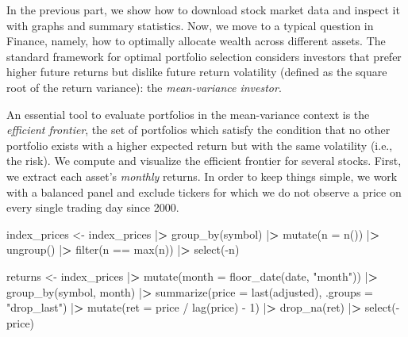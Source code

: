 \documentclass[
]{book}
\newenvironment{Shaded}{\begin{snugshade}}{\end{snugshade}}
\newcommand{\AttributeTok}[1]{\textcolor[rgb]{0.61,0.61,0.61}{#1}}
\newcommand{\DecValTok}[1]{\textcolor[rgb]{0.06,0.06,0.06}{#1}}
\newcommand{\ErrorTok}[1]{\textcolor[rgb]{0.14,0.14,0.14}{\textbf{#1}}}
\newcommand{\FunctionTok}[1]{\textcolor[rgb]{0,0,0}{#1}}
\newcommand{\NormalTok}[1]{#1}
\newcommand{\OtherTok}[1]{\textcolor[rgb]{0.37,0.37,0.37}{#1}}
\newcommand{\SpecialCharTok}[1]{\textcolor[rgb]{0,0,0}{#1}}
\newcommand{\StringTok}[1]{\textcolor[rgb]{0.5,0.5,0.5}{#1}}
\begin{document}
In the previous part, we show how to download stock market data and inspect it with graphs and summary statistics. Now, we move to a typical question in Finance, namely, how to optimally allocate wealth across different assets. The standard framework for optimal portfolio selection considers investors that prefer higher future returns but dislike future return volatility (defined as the square root of the return variance): the \emph{mean-variance investor}.

An essential tool to evaluate portfolios in the mean-variance context is the \emph{efficient frontier}, the set of portfolios which satisfy the condition that no other portfolio exists with a higher expected return but with the same volatility (i.e., the risk). We compute and visualize the efficient frontier for several stocks.
First, we extract each asset's \emph{monthly} returns. In order to keep things simple, we work with a balanced panel and exclude tickers for which we do not observe a price on every single trading day since 2000.

\begin{Shaded}
\begin{Highlighting}[]
\NormalTok{index\_prices }\OtherTok{\textless{}{-}}\NormalTok{ index\_prices }\SpecialCharTok{|}\ErrorTok{\textgreater{}}
  \FunctionTok{group\_by}\NormalTok{(symbol) }\SpecialCharTok{|}\ErrorTok{\textgreater{}}
  \FunctionTok{mutate}\NormalTok{(}\AttributeTok{n =} \FunctionTok{n}\NormalTok{()) }\SpecialCharTok{|}\ErrorTok{\textgreater{}}
  \FunctionTok{ungroup}\NormalTok{() }\SpecialCharTok{|}\ErrorTok{\textgreater{}}
  \FunctionTok{filter}\NormalTok{(n }\SpecialCharTok{==} \FunctionTok{max}\NormalTok{(n)) }\SpecialCharTok{|}\ErrorTok{\textgreater{}}
  \FunctionTok{select}\NormalTok{(}\SpecialCharTok{{-}}\NormalTok{n)}

\NormalTok{returns }\OtherTok{\textless{}{-}}\NormalTok{ index\_prices }\SpecialCharTok{|}\ErrorTok{\textgreater{}}
  \FunctionTok{mutate}\NormalTok{(}\AttributeTok{month =} \FunctionTok{floor\_date}\NormalTok{(date, }\StringTok{"month"}\NormalTok{)) }\SpecialCharTok{|}\ErrorTok{\textgreater{}}
  \FunctionTok{group\_by}\NormalTok{(symbol, month) }\SpecialCharTok{|}\ErrorTok{\textgreater{}}
  \FunctionTok{summarize}\NormalTok{(}\AttributeTok{price =} \FunctionTok{last}\NormalTok{(adjusted), }\AttributeTok{.groups =} \StringTok{"drop\_last"}\NormalTok{) }\SpecialCharTok{|}\ErrorTok{\textgreater{}}
  \FunctionTok{mutate}\NormalTok{(}\AttributeTok{ret =}\NormalTok{ price }\SpecialCharTok{/} \FunctionTok{lag}\NormalTok{(price) }\SpecialCharTok{{-}} \DecValTok{1}\NormalTok{) }\SpecialCharTok{|}\ErrorTok{\textgreater{}}
  \FunctionTok{drop\_na}\NormalTok{(ret) }\SpecialCharTok{|}\ErrorTok{\textgreater{}}
  \FunctionTok{select}\NormalTok{(}\SpecialCharTok{{-}}\NormalTok{price)}
\end{Highlighting}
\end{Shaded}
\end{document}
